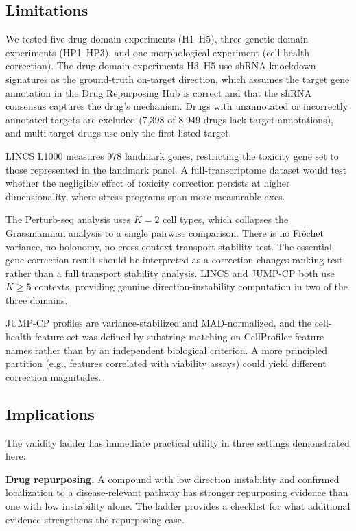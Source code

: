 \documentclass{article}
\begin{document}
\subsection{Limitations}

We tested five drug-domain experiments (H1--H5), three genetic-domain
experiments (HP1--HP3), and one morphological experiment (cell-health
correction). The drug-domain experiments H3--H5 use shRNA knockdown
signatures as the ground-truth on-target direction, which assumes the
target gene annotation in the Drug Repurposing Hub is correct and that
the shRNA consensus captures the drug's mechanism. Drugs with
unannotated or incorrectly annotated targets are excluded (7{,}398 of
8{,}949 drugs lack target annotations), and multi-target drugs use only
the first listed target.

LINCS L1000 measures 978 landmark genes, restricting the toxicity gene set to
those represented in the landmark panel. A full-transcriptome dataset would
test whether the negligible effect of toxicity correction persists at higher
dimensionality, where stress programs span more measurable axes.

The Perturb-seq analysis uses $K = 2$ cell types, which collapses the
Grassmannian analysis to a single pairwise comparison. There is no Fr\'echet
variance, no holonomy, no cross-context transport stability test. The
essential-gene correction result should be interpreted as a
correction-changes-ranking test rather than a full transport stability
analysis. LINCS and JUMP-CP both use $K \geq 5$ contexts, providing
genuine direction-instability computation in two of the three domains.

JUMP-CP profiles are variance-stabilized and MAD-normalized, and the
cell-health feature set was defined by substring matching on CellProfiler
feature names rather than by an independent biological criterion. A more
principled partition (e.g., features correlated with viability assays)
could yield different correction magnitudes.

\subsection{Implications}

The validity ladder has immediate practical utility in three settings
demonstrated here:

\textbf{Drug repurposing.} A compound with low direction instability and
confirmed localization to a disease-relevant pathway has stronger repurposing
evidence than one with low instability alone. The ladder provides a checklist
for what additional evidence strengthens the repurposing case.
\end{document}
